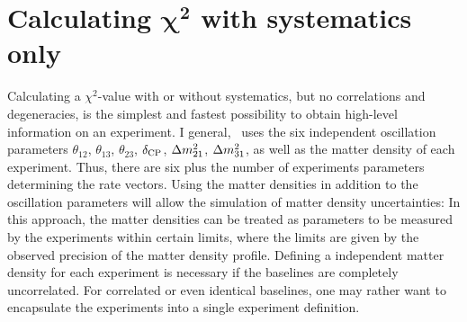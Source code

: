 \chapter[Calculating $\chi^2$ with systematics only]{Calculating $\boldsymbol{\chi^2}$ with systematics only}

Calculating a $\chi^2$-value with or without systematics, but no correlations and degeneracies, is the simplest and fastest possibility to obtain high-level information on an experiment. I general, \GLOBES\ uses the six independent oscillation parameters $\theta_{12}$, $\theta_{13}$, $\theta_{23}$, $\delta_{\mathrm{CP}}$, $\Delta m_{21}^2$, $\Delta m_{31}^2$, as well as the matter density of each experiment. Thus, there are six plus the number of experiments parameters determining the rate vectors. Using the matter densities in addition to the oscillation parameters will allow the simulation of matter density uncertainties: In this approach, the matter densities can be treated as parameters to be measured by the experiments within certain limits, where the limits are given by the observed precision of the matter density profile. Defining a independent matter density for each experiment is necessary if the baselines are completely uncorrelated. For correlated or even identical baselines, one may rather want to encapsulate the experiments into a single experiment definition. 

